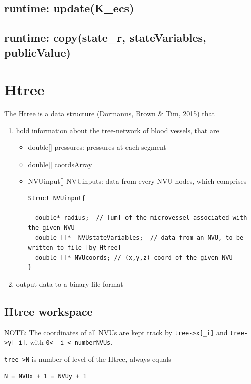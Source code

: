 \subsection{runtime: update(K\_ecs)}

\subsection{runtime: copy(state\_r, stateVariables, publicValue)}

\section{Htree}
\label{sec:Htree}

The Htree is a data structure (Dormanns, Brown \& Tim, 2015) that 
\begin{enumerate}
  \item hold information about the tree-network of
blood vessels, that are

\begin{itemize}
  \item double[] pressures: pressures at each segment
  \item double[] coordsArray
  
  \item NVUinput[] NVUinputs: data from every NVU nodes, which comprises
  
\begin{verbatim}
Struct NVUinput{
  
  double* radius;  // [um] of the microvessel associated with the given NVU
  double []*  NVUstateVariables;  // data from an NVU, to be written to file [by Htree]
  double []* NVUcoords; // (x,y,z) coord of the given NVU
}
\end{verbatim}
\end{itemize}

  \item output data to a binary file format
\end{enumerate}

\subsection{Htree workspace}
\label{sec:Htree-workspace}

NOTE: The coordinates of all NVUs are kept track by \verb!tree->x[_i]! and
\verb!tree->y[_i]!, with \verb!0< _i < numberNVUs!.

\verb!tree->N! is number of level of the Htree, always equals 
\begin{verbatim}
N = NVUx + 1 = NVUy + 1
\end{verbatim}


